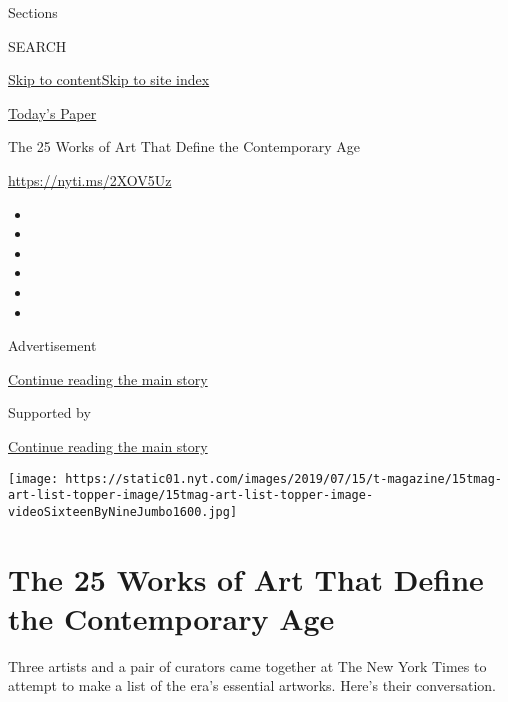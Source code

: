 Sections

SEARCH

\protect\hyperlink{site-content}{Skip to
content}\protect\hyperlink{site-index}{Skip to site index}

\href{https://myaccount.nytimes.com/auth/login?response_type=cookie\&client_id=vi}{}

\href{https://www.nytimes.com/section/todayspaper}{Today's Paper}

The 25 Works of Art That Define the Contemporary Age

\href{https://nyti.ms/2XOV5Uz}{https://nyti.ms/2XOV5Uz}

\begin{itemize}
\item
\item
\item
\item
\item
\item
\end{itemize}

Advertisement

\protect\hyperlink{after-top}{Continue reading the main story}

Supported by

\protect\hyperlink{after-sponsor}{Continue reading the main story}

\texttt{[image: https://static01.nyt.com/images/2019/07/15/t-magazine/15tmag-art-list-topper-image/15tmag-art-list-topper-image-videoSixteenByNineJumbo1600.jpg]}

\hypertarget{the-25-works-of-art-that-define-the-contemporary-age}{%
\section{The 25 Works of Art That Define the Contemporary
Age}\label{the-25-works-of-art-that-define-the-contemporary-age}}

Three artists and a pair of curators came together at The New York Times
to attempt to make a list of the era's essential artworks. Here's their
conversation.


